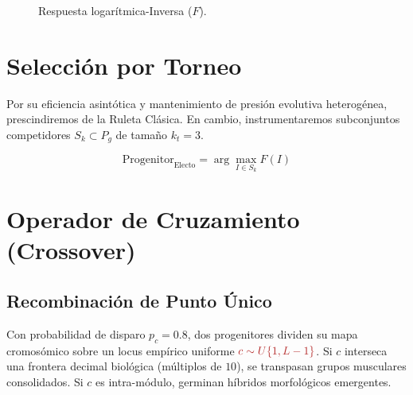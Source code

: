 \documentclass[11pt, a4paper]{article}
\begin{document}
\begin{figure}[H]
    \centering
    \caption{Respuesta logarítmica-Inversa ($F$).}
\end{figure}


\section{Selección por Torneo}

Por su eficiencia asintótica y mantenimiento de presión evolutiva heterogénea, prescindiremos de la Ruleta Clásica. En cambio, instrumentaremos subconjuntos competidores $S_k \subset P_g$ de tamaño \textcolor{coreblue}{$k_t = 3$}.

\begin{equation}
\text{Progenitor}_{\text{Electo}} = \arg\max_{I \in S_{k}} F(I)
\end{equation}


\section{Operador de Cruzamiento (Crossover)}

\subsection{Recombinación de Punto Único}
Con probabilidad de disparo $p_c = 0.8$, dos progenitores dividen su mapa cromosómico sobre un locus empírico uniforme $\textcolor{corered}{c \sim U\{1, L-1\}}$. 
Si $c$ interseca una frontera decimal biológica (múltiplos de $10$), se transpasan grupos musculares consolidados. Si $c$ es intra-módulo, germinan híbridos morfológicos emergentes.
\end{document}

